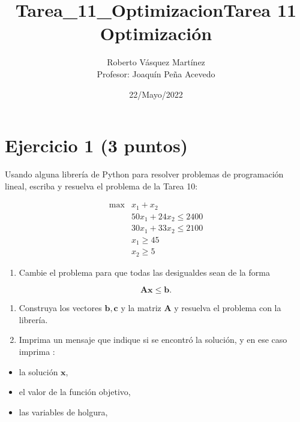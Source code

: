 \documentclass[11pt]{article}
\title{Tarea\_11\_Optimizacion}
\providecommand{\tightlist}{%
      \setlength{\itemsep}{0pt}\setlength{\parskip}{0pt}}
\begin{document}
    
\title{Tarea 11 Optimización}
\author{Roberto Vásquez Martínez \\ Profesor: Joaquín Peña Acevedo}
\date{22/Mayo/2022}
\maketitle 
    
    
    

    
    \hypertarget{ejercicio-1-3-puntos}{%
\section{Ejercicio 1 (3 puntos)}\label{ejercicio-1-3-puntos}}

Usando alguna librería de Python para resolver problemas de programación
lineal, escriba y resuelva el problema de la Tarea 10:

\[
\begin{array}{rl}
\max & x_1 + x_2\\
     & 50x_1 + 24x_2 \leq 2400 \\
     & 30x_1 + 33x_2 \leq 2100 \\
     & x_1 \geq 45 \\
     & x_2 \geq 5
\end{array}
\]

\begin{enumerate}
\def\labelenumi{\arabic{enumi}.}
\tightlist
\item
  Cambie el problema para que todas las desigualdes sean de la forma
\end{enumerate}

\[\mathbf{A}\mathbf{x}\leq \mathbf{b}.\]

\begin{enumerate}
\def\labelenumi{\arabic{enumi}.}
\setcounter{enumi}{1}
\item
  Construya los vectores \(\mathbf{b},\mathbf{c}\) y la matriz
  \(\mathbf{A}\) y resuelva el problema con la librería.
\item
  Imprima un mensaje que indique si se encontró la solución, y en ese
  caso imprima :
\end{enumerate}

\begin{itemize}
\tightlist
\item
  la solución \(\mathbf{x}\),
\item
  el valor de la función objetivo,
\item
  las variables de holgura,
\end{itemize}
\end{document}
